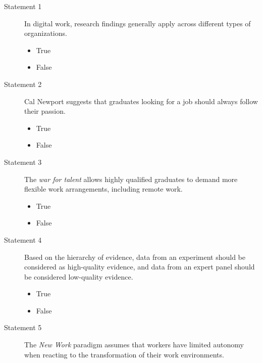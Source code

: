 \documentclass[12pt]{scrartcl}
\begin{document}
\begin{description}

	\item[Statement 1] In digital work, research findings generally apply across different types of organizations.

	\begin{multicols}{2}
		\begin{itemize}[label={\Square}]
			\item True
			\item False
		\end{itemize}
	\end{multicols}

	\item[Statement 2] Cal Newport suggests that graduates looking for a job should always follow their passion.
	
	\begin{multicols}{2}
		\begin{itemize}[label={\Square}]
			\item True
			\item False
		\end{itemize}
	\end{multicols}

	\item[Statement 3] The \textit{war for talent} allows highly qualified graduates to demand more flexible work arrangements, including remote work.

	\begin{multicols}{2}
		\begin{itemize}[label={\Square}]
			\item True
			\item False
		\end{itemize}
	\end{multicols}

	\item[Statement 4] Based on the hierarchy of evidence, data from an experiment should be considered as high-quality evidence, and data from an expert panel should be considered low-quality evidence.

	\begin{multicols}{2}
		\begin{itemize}[label={\Square}]
			\item True
			\item False
		\end{itemize}
	\end{multicols}

	\item[Statement 5] The \textit{New Work} paradigm assumes that workers have limited autonomy when reacting to the transformation of their work environments.


\end{description}
\end{document}
